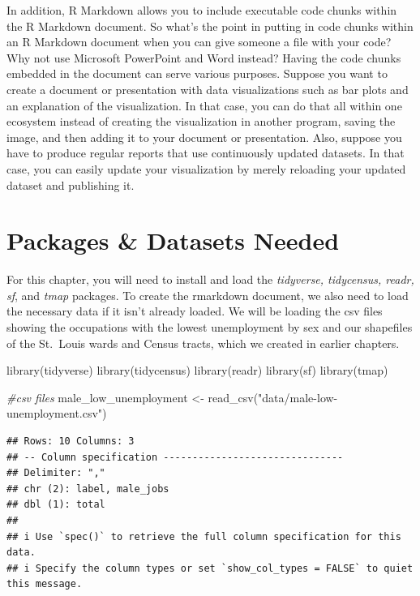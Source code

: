 \documentclass[
  krantz2]{krantz}
\makeatletter
\newenvironment{Shaded}{\begin{snugshade}}{\end{snugshade}}
\newcommand{\CommentTok}[1]{\textcolor[rgb]{0.37,0.37,0.37}{\textit{#1}}}
\newcommand{\FunctionTok}[1]{\textcolor[rgb]{0,0,0}{#1}}
\newcommand{\NormalTok}[1]{#1}
\newcommand{\OtherTok}[1]{\textcolor[rgb]{0.37,0.37,0.37}{#1}}
\newcommand{\StringTok}[1]{\textcolor[rgb]{0.5,0.5,0.5}{#1}}
\newenvironment{kframe}{%
\medskip{}
\setlength{\fboxsep}{.8em}
 \def\at@end@of@kframe{}%
 \ifinner\ifhmode%
  \def\at@end@of@kframe{\end{minipage}}%
  \begin{minipage}{\columnwidth}%
 \fi\fi%
 \def\FrameCommand##1{\hskip\@totalleftmargin \hskip-\fboxsep
 \colorbox{shadecolor}{##1}\hskip-\fboxsep
     \hskip-\linewidth \hskip-\@totalleftmargin \hskip\columnwidth}%
 \MakeFramed {\advance\hsize-\width
   \@totalleftmargin\z@ \linewidth\hsize
   \@setminipage}}%
 {\par\unskip\endMakeFramed%
 \at@end@of@kframe}
\renewenvironment{Shaded}{\begin{kframe}}{\end{kframe}}
\makeatother
\begin{document}
In addition, R Markdown allows you to include executable code chunks within the R Markdown document. So what's the point in putting in code chunks within an R Markdown document when you can give someone a file with your code? Why not use Microsoft PowerPoint and Word instead? Having the code chunks embedded in the document can serve various purposes. Suppose you want to create a document or presentation with data visualizations such as bar plots and an explanation of the visualization. In that case, you can do that all within one ecosystem instead of creating the visualization in another program, saving the image, and then adding it to your document or presentation. Also, suppose you have to produce regular reports that use continuously updated datasets. In that case, you can easily update your visualization by merely reloading your updated dataset and publishing it.

\hypertarget{rmarkdown-pkgs}{%
\section{Packages \& Datasets Needed}\label{rmarkdown-pkgs}}

For this chapter, you will need to install and load the \emph{tidyverse, tidycensus, readr, sf}, and \emph{tmap} packages. To create the rmarkdown document, we also need to load the necessary data if it isn't already loaded. We will be loading the csv files showing the occupations with the lowest unemployment by sex and our shapefiles of the St.~Louis wards and Census tracts, which we created in earlier chapters.

\begin{Shaded}
\begin{Highlighting}[]
\FunctionTok{library}\NormalTok{(tidyverse)}
\FunctionTok{library}\NormalTok{(tidycensus)}
\FunctionTok{library}\NormalTok{(readr)}
\FunctionTok{library}\NormalTok{(sf)}
\FunctionTok{library}\NormalTok{(tmap)}

\CommentTok{\#csv files}
\NormalTok{male\_low\_unemployment }\OtherTok{\textless{}{-}} \FunctionTok{read\_csv}\NormalTok{(}\StringTok{"data/male{-}low{-}unemployment.csv"}\NormalTok{)}
\end{Highlighting}
\end{Shaded}

\begin{verbatim}
## Rows: 10 Columns: 3
## -- Column specification -------------------------------
## Delimiter: ","
## chr (2): label, male_jobs
## dbl (1): total
##
## i Use `spec()` to retrieve the full column specification for this data.
## i Specify the column types or set `show_col_types = FALSE` to quiet this message.
\end{verbatim}
\end{document}

